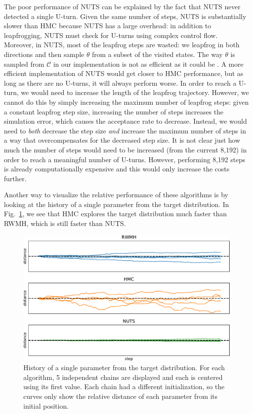 \documentclass[12pt]{article}
\begin{document}
The poor performance of NUTS can be explained by the fact that NUTS never detected a single U-turn. Given the same number of steps, NUTS is substantially slower than HMC because NUTS has a large overhead: in addition to leapfrogging, NUTS must check for U-turns using complex control flow. Moreover, in NUTS, most of the leapfrog steps are wasted: we leapfrog in both directions and then sample $\theta$ from a subset of the visited states. The way $\theta$ is sampled from $\mathcal{C}$ in our implementation is not as efficient as it could be \cite{nuts}. A more efficient implementation of NUTS would get closer to HMC performance, but as long as there are no U-turns, it will always perform worse. In order to reach a U-turn, we would need to increase the length of the leapfrog trajectory. However, we cannot do this by simply increasing the maximum number of leapfrog steps: given a constant leapfrog step size, increasing the number of steps increases the simulation error, which causes the acceptance rate to decrease. Instead, we would need to \textit{both} decrease the step size \textit{and} increase the maximum number of steps in a way that overcompensates for the decreased step size. It is not clear just how much the number of steps would need to be increased (from the current 8,192) in order to reach a meaningful number of U-turns. However, performing 8,192 steps is already computationally expensive and this would only increase the costs further.

Another way to visualize the relative performance of these algorithms is by looking at the history of a single parameter from the target distribution. In Fig.\ \ref{fig_uci_param_history}, we see that HMC explores the target distribution much faster than RWMH, which is still faster than NUTS.

\begin{figure}[H]
\centering
\includegraphics[width=16cm]{plots/uci_param_history.pdf}
\caption{History of a single parameter from the target distribution. For each algorithm, 5 independent chains are displayed and each is centered using its first value. Each chain had a different initialization, so the curves only show the relative distance of each parameter from its initial position.}
\label{fig_uci_param_history}
\end{figure}
\end{document}
